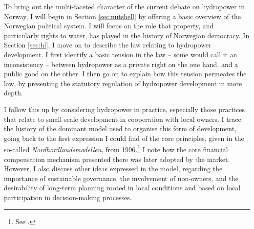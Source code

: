 %

To bring out the multi-faceted character of the current debate on hydropower in Norway, I will begin in Section \ref{sec:nutshell} by offering a basic overview of the Norwegian political system. I will focus on the role that property, and particularly rights to water, has played in the history of Norwegian democracy. In Section \ref{sec:hl}, I move on to describe the law relating to hydropower development. I first identify a basic tension in the law -- some would call it an inconsistency -- between hydropower as a private right on the one hand, and a public good on the other. I then go on to explain how this tension permeates the law, by presenting the statutory regulation of hydropower development in more depth.

I follow this up by considering hydropower in practice, especially those practices that relate to small-scale development in cooperation with local owners. I trace the history of the dominant model used to organise this form of development, going back to the first expression I could find of the core principles, given in the so-called {\it Nordhordlandsmodellen}, from 1996.\footnote{See  \cite{dyrkolbotn96}.} I note how the core financial compensation mechanism presented there was later adopted by the market. However, I also discuss other ideas expressed in the model, regarding the importance of sustainable governance, the involvement of non-owners, and the desirability of long-term planning rooted in local conditions and based on local participation in decision-making processes.

